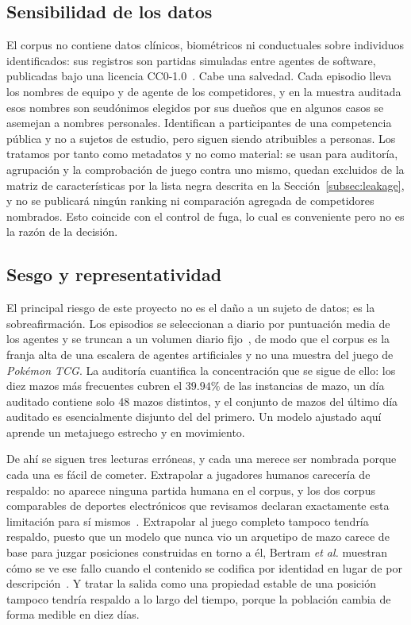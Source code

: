 \documentclass[conference]{IEEEtran}
\begin{document}
\subsection{Sensibilidad de los datos}
El corpus no contiene datos cl\'inicos, biom\'etricos ni conductuales sobre
individuos identificados: sus registros son partidas simuladas entre agentes
de software, publicadas bajo una licencia
CC0-1.0~\cite{ptcg_dataset_2026}. Cabe una salvedad. Cada episodio lleva los
nombres de equipo y de agente de los competidores, y en la muestra auditada
esos nombres son seud\'onimos elegidos por sus due\~nos que en algunos casos
se asemejan a nombres personales. Identifican a participantes de una
competencia p\'ublica y no a sujetos de estudio, pero siguen siendo
atribuibles a personas. Los tratamos por tanto como metadatos y no como
material: se usan para auditor\'ia, agrupaci\'on y la comprobaci\'on de juego
contra uno mismo, quedan excluidos de la matriz de caracter\'isticas por la
lista negra descrita en la Secci\'on~\ref{subsec:leakage}, y no se
publicar\'a ning\'un ranking ni comparaci\'on agregada de competidores
nombrados. Esto coincide con el control de fuga, lo cual es conveniente pero
no es la raz\'on de la decisi\'on.

\subsection{Sesgo y representatividad}
El principal riesgo de este proyecto no es el da\~no a un sujeto de datos;
es la sobreafirmaci\'on. Los episodios se seleccionan a diario por
puntuaci\'on media de los agentes y se truncan a un volumen diario
fijo~\cite{ptcg_dataset_2026}, de modo que el corpus es la franja alta de una
escalera de agentes artificiales y no una muestra del juego de
\emph{Pok\'emon TCG}. La auditor\'ia cuantifica la concentraci\'on que se
sigue de ello: los diez mazos m\'as frecuentes cubren el $39.94\%$ de las
instancias de mazo, un d\'ia auditado contiene solo 48 mazos distintos, y el
conjunto de mazos del \'ultimo d\'ia auditado es esencialmente disjunto del
del primero. Un modelo ajustado aqu\'i aprende un metajuego estrecho y en
movimiento.

De ah\'i se siguen tres lecturas err\'oneas, y cada una merece ser nombrada
porque cada una es f\'acil de cometer. Extrapolar a jugadores humanos
carecer\'ia de respaldo: no aparece ninguna partida humana en el corpus, y
los dos corpus comparables de deportes electr\'onicos que revisamos declaran
exactamente esta limitaci\'on para s\'i
mismos~\cite{bialecki_sc2egset_2023,janusz_hearthstone_2017}. Extrapolar al
juego completo tampoco tendr\'ia respaldo, puesto que un modelo que nunca vio
un arquetipo de mazo carece de base para juzgar posiciones construidas en
torno a \'el, Bertram \textit{et al.} muestran c\'omo se ve ese fallo
cuando el contenido se codifica por identidad en lugar de por
descripci\'on~\cite{bertram_cardrepresentations_2024}. Y tratar la salida
como una propiedad estable de una posici\'on tampoco tendr\'ia respaldo a lo
largo del tiempo, porque la poblaci\'on cambia de forma medible en diez
d\'ias.
\end{document}
